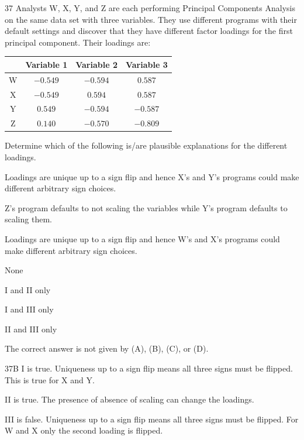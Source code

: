 \begin{question}{37}
Analysts W, X, Y, and Z are each performing Principal Components Analysis on the same data set with three variables. They use different programs with their default settings and discover that they have different factor loadings for the first principal component. Their loadings are:

\begin{center}
\begin{tabular}{|c|c|c|c|}
\hline
 & Variable 1 & Variable 2 & Variable 3 \\ \hline
W & $-0.549$ & $-0.594$ & $0.587$ \\ \hline
X & $-0.549$ & $0.594$ & $0.587$ \\ \hline
Y & $0.549$ & $-0.594$ & $-0.587$ \\ \hline
Z & $0.140$ & $-0.570$ & $-0.809$ \\ \hline
\end{tabular}
\end{center}

Determine which of the following is/are plausible explanations for the different loadings.
\begin{statements}
\item Loadings are unique up to a sign flip and hence X's and Y's programs could make different arbitrary sign choices.
\item Z's program defaults to not scaling the variables while Y's program defaults to scaling them.
\item Loadings are unique up to a sign flip and hence W's and X's programs could make different arbitrary sign choices.
\end{statements}

\begin{choices}
\item None
\item I and II only
\item I and III only
\item II and III only
\item The correct answer is not given by (A), (B), (C), or (D).
\end{choices}
\end{question}
\begin{solution}{37}{B}
I is true. Uniqueness up to a sign flip means all three signs must be flipped. This is true for X and Y.

II is true. The presence of absence of scaling can change the loadings.

III is false. Uniqueness up to a sign flip means all three signs must be flipped. For W and X only the second loading is flipped.
\end{solution}

